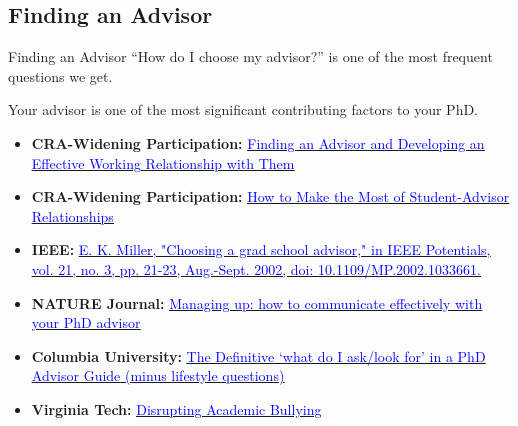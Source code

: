 \documentclass[aspectratio=169]{beamer}
\begin{document}
\subsection{Finding an Advisor}
\begin{frame}{Finding an Advisor}
\noindent ``How do I choose my advisor?'' is one of the most frequent questions we get.

Your advisor is one of the most significant contributing factors to your PhD.


\vspace{0.33cm}
{\scriptsize
\begin{itemize}
    \item \textbf{CRA-Widening Participation:} \href{https://acrobat.adobe.com/link/track?uri=urn:aaid:scds:US:5d051a05-acc1-3778-975f-a84d9553c2b1}{{\underline{\textcolor{blue}{Finding an Advisor and Developing an Effective Working}} {\underline{\textcolor{blue} {Relationship with Them}}}}}
    
    \item \textbf{CRA-Widening Participation:} \href{https://cra.org/cra-wp/wp-content/uploads/sites/8/2022/04/Advising_Relationship.pdf}{{\underline{\textcolor{blue}{How to Make the Most of Student-Advisor Relationships}}}}
    \item \textbf{IEEE:} \href{https://ieeexplore.ieee.org/stamp/stamp.jsp?tp=&arnumber=1033661}{\underline{\textcolor{blue}{E. K. Miller, "Choosing a grad school advisor," in IEEE Potentials, vol. 21, no. 3, pp.}} \underline{\textcolor{blue}{21-23, Aug.-Sept. 2002, doi: 10.1109/MP.2002.1033661.}}}
    \item \textbf{NATURE Journal:} \href{https://www.nature.com/articles/d41586-021-03703-z}{\underline{\textcolor{blue}{Managing up: how to communicate effectively with your PhD advisor}}}
    \item \textbf{Columbia University:} \href{https://www.cs.columbia.edu/wp-content/uploads/2019/03/Get-Advisor.pdf}{\underline{\textcolor{blue}{The Definitive ‘what do I ask/look for’ in a PhD Advisor Guide}} 
    \underline{\textcolor{blue}{(minus lifestyle questions)}}}
    \item \textbf{Virginia Tech:} \href{https://www.graduate.ombudsman.vt.edu/disrupting_academic_bullying.html}{\underline{\textcolor{blue}{Disrupting Academic Bullying}}}
\end{itemize}
}




\end{frame}
\end{document}
